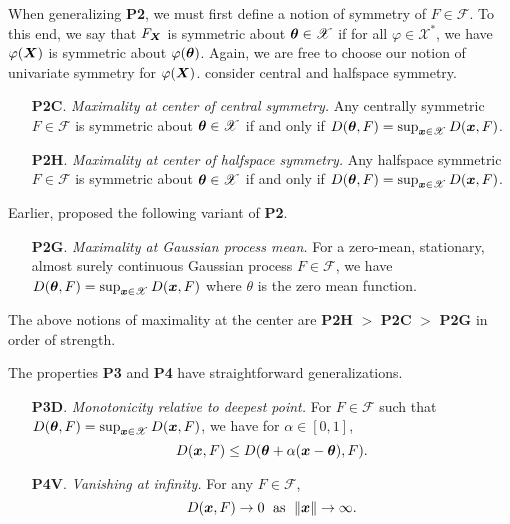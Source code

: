 When generalizing \textbf{P2}, we must first define a notion of symmetry of $F
\in \mathscr{F}$.
To this end, we say that $F_{\bm{X}}$ is symmetric about $\bm{\theta} \in \mathscr{X}$
if for all $\varphi \in \mathscr{X}^*$, we have $\varphi(\bm{X})$ is symmetric
about $\varphi(\bm{\theta})$.
Again, we are free to choose our notion of univariate symmetry for
$\varphi(\bm{X})$.
\textcite{gijbels-nagy-2017} consider central and halfspace symmetry.

\begin{enumerate}
    \item[\textbf{P2C}.] \emph{Maximality at center of central symmetry.}
    Any centrally symmetric $F \in \mathscr{F}$ is symmetric about $\bm{\theta} \in
    \mathscr{X}$ if and only if $D(\bm{\theta}, F) = \sup_{\bm{x} \in \mathscr{X}}
    D(\bm{x}, F)$.

    \item[\textbf{P2H}.] \emph{Maximality at center of halfspace symmetry.}
    Any halfspace symmetric $F \in \mathscr{F}$ is symmetric about $\bm{\theta} \in
    \mathscr{X}$ if and only if $D(\bm{\theta}, F) = \sup_{\bm{x} \in \mathscr{X}}
    D(\bm{x}, F)$.
\end{enumerate}

Earlier, \textcite{reyes-battey-2016} proposed the following variant of
\textbf{P2}.
\begin{enumerate}
    \item[\textbf{P2G}.] \emph{Maximality at Gaussian process mean.}
    For a zero-mean, stationary, almost surely continuous Gaussian process $F
    \in \mathscr{F}$, we have $D(\bm{\theta}, F) = \sup_{\bm{x} \in \mathscr{X}} D(\bm{x},
    F)$ where $\theta$ is the zero mean function.
\end{enumerate}
The above notions of maximality at the center are \textbf{P2H} $>$
\textbf{P2C} $>$ \textbf{P2G} in order of strength.

The properties \textbf{P3} and \textbf{P4} have straightforward
generalizations.
\begin{enumerate}
    \item[\textbf{P3D}.] \emph{Monotonicity relative to deepest point.}
    For $F \in \mathscr{F}$ such that $D(\bm{\theta}, F) = \sup_{\bm{x} \in \mathscr{X}}
    D(\bm{x}, F)$, we have for $\alpha \in [0, 1]$,
    \begin{equation}
        D(\bm{x}, F) \leq D(\bm{\theta} + \alpha(\bm{x} - \bm{\theta}), F).
    \end{equation}

    \item[\textbf{P4V}.] \emph{Vanishing at infinity.} For any $F \in
    \mathscr{F}$,
    \begin{equation}
        D(\bm{x}, F) \to 0\;\text{ as }\; \Vert \bm{x} \Vert \to \infty.
    \end{equation}
\end{enumerate}


